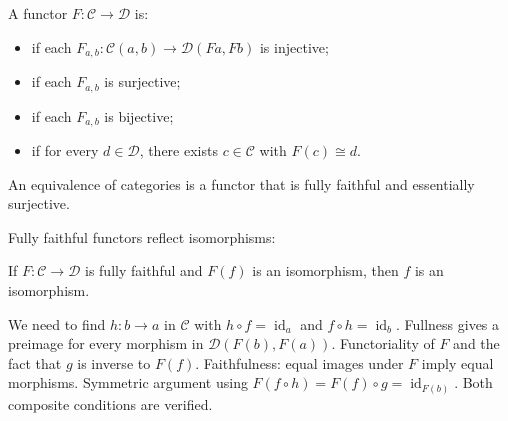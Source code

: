 \begin{definition}
A functor $F : \mathcal{C} \to \mathcal{D}$ is:
\begin{itemize}
  \item {} if each $F_{a,b} : \mathcal{C}(a,b) \to \mathcal{D}(Fa,Fb)$
    is injective;
  \item {} if each $F_{a,b}$ is surjective;
  \item {} if each $F_{a,b}$ is bijective;
  \item {} if for every $d \in \mathcal{D}$, there
    exists $c \in \mathcal{C}$ with $F(c) \cong d$.
\end{itemize}
An equivalence of categories is a functor that is fully faithful and essentially
surjective.
\end{definition}

Fully faithful functors reflect isomorphisms:

\begin{theorem}
If $F : \mathcal{C} \to \mathcal{D}$ is fully faithful and $F(f)$ is an
isomorphism, then $f$ is an isomorphism.
\end{theorem}

\begin{prooflog}
           {We need to find $h : b \to a$ in $\mathcal{C}$ with $h \circ f = \operatorname{id}_a$
            and $f \circ h = \operatorname{id}_b$.}
           {Fullness gives a preimage for every morphism in $\mathcal{D}(F(b), F(a))$.}
           {Functoriality of $F$ and the fact that $g$ is inverse to $F(f)$.}
           {Faithfulness: equal images under $F$ imply equal morphisms.}
           {Symmetric argument using $F(f \circ h) = F(f) \circ g = \operatorname{id}_{F(b)}$.}
           {Both composite conditions are verified.}
\end{prooflog}


